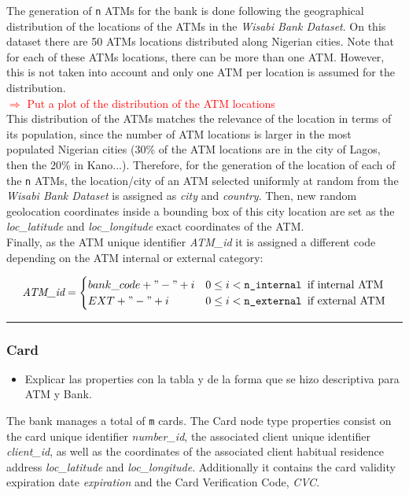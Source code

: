 \documentclass{article}
\begin{document}
The generation of \texttt{n} ATMs for the bank is done following
the geographical distribution of the locations of the ATMs in the \emph{Wisabi Bank Dataset}. 
On this dataset there are 50 ATMs locations distributed along Nigerian cities. 
Note that for each of these ATMs locations, there can be more than one ATM.
However, this is not taken into account and only one ATM per location is assumed for the 
distribution.\\
\textcolor{red}{$\Rightarrow$ Put a plot of the distribution of the ATM locations}\\
This distribution of the ATMs matches the relevance of the location in terms of its 
population, since the number of ATM locations is larger in the most populated 
Nigerian cities (30\% of the ATM locations are in the city of Lagos, then the 20\% in 
Kano...).
Therefore, for the generation of the location of each of the \texttt{n} ATMs, the location/city of an ATM selected uniformly at random from the \emph{Wisabi Bank Dataset} is assigned as \emph{city} and \emph{country}. Then, new random geolocation coordinates 
inside a bounding box of this city location are set as the \emph{loc\_latitude} and \emph{loc\_longitude} exact coordinates of the ATM. \\
Finally, as the ATM unique identifier \emph{ATM\_id} it is assigned a different code depending on the ATM internal or external category: 

\[
\emph{ATM\_id} =
\begin{cases} 
bank\_code + "-" + i & 0 \leq i < \texttt{n\_internal } \text{if internal ATM}  \\
EXT + "-" + i & 0 \leq i < \texttt{n\_external } \text{if external ATM}
\end{cases}
\]

\textcolor{green}{\rule{\linewidth}{0.4mm}}

\subsubsection*{Card}



\begin{itemize}
  \item Explicar las properties con la tabla y de la forma que se hizo descriptiva
  para ATM y Bank.
\end{itemize}

The bank manages a total of \texttt{m} cards. The Card node type properties consist on the card unique 
identifier \emph{number\_id}, the associated client unique identifier \emph{client\_id}, as well
as the coordinates of the associated client habitual residence address \emph{loc\_latitude} and 
\emph{loc\_longitude}. Additionally it contains the card validity expiration date \emph{expiration}
and the Card Verification Code, \emph{CVC}.\\
\end{document}
